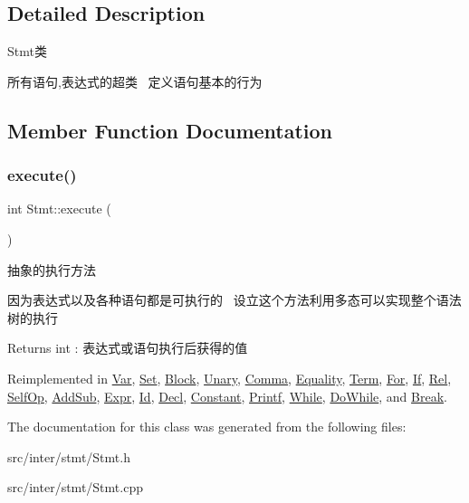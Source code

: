 \subsection{Detailed Description}
Stmt类 

所有语句,表达式的超类~\newline
定义语句基本的行为 

\subsection{Member Function Documentation}
\mbox{\label{class_stmt_abdc3261770c3c5bd3ce5b3ba6eedfaa4}} 
\subsubsection{\texorpdfstring{execute()}{execute()}}
{\footnotesize\ttfamily int Stmt\+::execute (\begin{DoxyParamCaption}{ }\end{DoxyParamCaption})\hspace{0.3cm}{\ttfamily [virtual]}}



抽象的执行方法 

因为表达式以及各种语句都是可执行的~\newline
设立这个方法利用多态可以实现整个语法树的执行~\newline
 \begin{DoxyReturn}{Returns}
int \+: 表达式或语句执行后获得的值 
\end{DoxyReturn}


Reimplemented in \hyperlink{class_var_a9dc96e803f7b0f9aa519c2c0e0a6bd8f}{Var}, \hyperlink{class_set_a7776ba36f3af8b09772b36927beb5f5c}{Set}, \hyperlink{class_block_a8e03f15df4e43cd6c802341c3bda6b33}{Block}, \hyperlink{class_unary_af42edff1ee4718a9afeb7127e41af758}{Unary}, \hyperlink{class_comma_aab9ca2bb70a10abd2fb263de745f843a}{Comma}, \hyperlink{class_equality_a0255c33af70613b006b03a329ed329ff}{Equality}, \hyperlink{class_term_ac2d20115da73f9425e5d390856a211a1}{Term}, \hyperlink{class_for_ad099d6d48c640dd5127285e59bbaba15}{For}, \hyperlink{class_if_aeadf929258ccd07a239879c118fb152f}{If}, \hyperlink{class_rel_a82b2f3b75a2b9e81631f2659d42a36d1}{Rel}, \hyperlink{class_self_op_ab452bcad1cd4f1286813b1f737583818}{Self\+Op}, \hyperlink{class_add_sub_a73c0513a31a5400fdfc79ce877a1c3b9}{Add\+Sub}, \hyperlink{class_expr_aff6a2e6eaa460e2a3db28ebdab089b51}{Expr}, \hyperlink{class_id_ae43a9ffecbbc0ac4fd041b8e8e3c3de0}{Id}, \hyperlink{class_decl_ad6495a4245a45dcdcd05e239c8db4a8b}{Decl}, \hyperlink{class_constant_ab5c55607bcff5ce70131a588b6bdbed7}{Constant}, \hyperlink{class_printf_a0343199e28647ced40b9d74a284ff5f3}{Printf}, \hyperlink{class_while_a23b58565983130bb54577f4399ffd822}{While}, \hyperlink{class_do_while_adb6934e033f44c6b52b1079faf1d84cf}{Do\+While}, and \hyperlink{class_break_a554fd4cae05d203145d62868f73004d4}{Break}.



The documentation for this class was generated from the following files\+:\begin{DoxyCompactItemize}
\item 
src/inter/stmt/Stmt.\+h\item 
src/inter/stmt/Stmt.\+cpp\end{DoxyCompactItemize}
